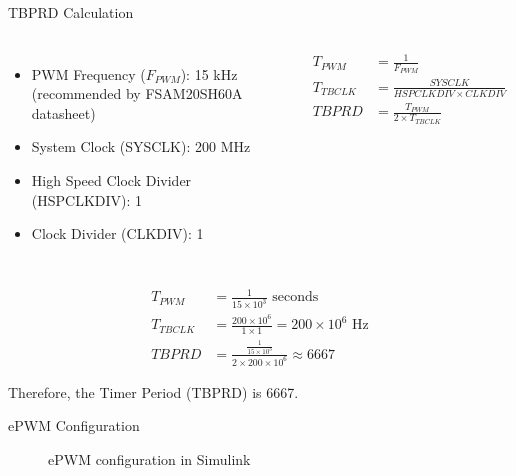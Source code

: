 \begin{frame}{TBPRD Calculation}

	\begin{columns}[T]
		\begin{itemize}
			\item PWM Frequency ($F_{PWM}$): 15 kHz (recommended by FSAM20SH60A datasheet)
			\item System Clock (SYSCLK): 200 MHz
			\item High Speed Clock Divider (HSPCLKDIV): 1
			\item Clock Divider (CLKDIV): 1
		\end{itemize}
		\begin{align*}
			T_{PWM}   & = \frac{1}{F_{PWM}}                      \\
			T_{TBCLK} & = \frac{SYSCLK}{HSPCLKDIV \times CLKDIV} \\
			TBPRD     & = \frac{T_{PWM}}{2 \times T_{TBCLK}}
		\end{align*}
	\end{columns}

	\vspace{0.5cm}

	\begin{align*}
		T_{PWM}   & = \frac{1}{15 \times 10^3} \text{ seconds}                               \\
		T_{TBCLK} & = \frac{200 \times 10^6}{1 \times 1} = 200 \times 10^6 \text{ Hz}        \\
		TBPRD     & = \frac{\frac{1}{15 \times 10^3}}{2 \times 200 \times 10^6} \approx 6667
	\end{align*}

	\tiny{Therefore, the Timer Period (TBPRD) is 6667.}
\end{frame}


\begin{frame}{ePWM Configuration}
	\begin{figure}
		\centering
		\caption{ePWM configuration in Simulink}
	\end{figure}
\end{frame}


